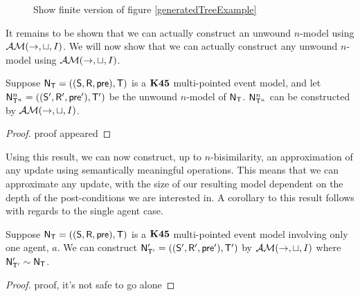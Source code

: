 \begin{figure}
\centering
\caption{\FIXME Show finite version of figure \ref{generatedTreeExample}} \label{genSubtreeExample}
\end{figure}

It remains to be shown that we can actually construct an unwound $n$-model using
$\mathcal{AM}(\to,\sqcup,I)$.
We will now show that we can actually construct any unwound $n$-model using $\mathcal{AM}(\to,
\sqcup, I)$.

\begin{lemma} \label{unwoundNModelGenerated}
  Suppose $\mathrm{\mathsf{N}}_\mathrm{\mathsf{T}} = ((\mathrm{\mathsf{S}},\mathrm{\mathsf{R}},\mathrm{\mathsf{pre}}),\mathrm{\mathsf{T}})$ is a $\bf K45$ multi-pointed
  event model, and let $\mathrm{\mathsf{N}}^n_{\mathrm{\mathsf{T}}^n} = ((\mathrm{\mathsf{S}}', \mathrm{\mathsf{R}}', \mathrm{\mathsf{pre}}'),\mathrm{\mathsf{T}}')$ be the
  unwound $n$-model of $\mathrm{\mathsf{N}}_\mathrm{\mathsf{T}}$.
  $\mathrm{\mathsf{N}}^n_{\mathrm{\mathsf{T}}^n}$ can be constructed by $\mathcal{AM}(\to, \sqcup, I)$.
\end{lemma}
\begin{proof}
	\FIXME proof appeared
\end{proof}

Using this result, we can now construct, up to $n$-bisimilarity, an
approximation of any update using semantically meaningful operations.
This means that we can approximate any update, with the size of our resulting
model dependent on the depth of the post-conditions we are interested in.
A corollary to this result follows with regards to the single agent case.

\begin{corr}
  Suppose $\mathrm{\mathsf{N}}_\mathrm{\mathsf{T}} = ((\mathrm{\mathsf{S}},\mathrm{\mathsf{R}},\mathrm{\mathsf{pre}}),\mathrm{\mathsf{T}})$ is a $\bf K45$ multi-pointed
  event model involving only one agent, $a$.
  We can construct $\mathrm{\mathsf{N}}'_{\mathrm{\mathsf{T}}'} = ((\mathrm{\mathsf{S}}',\mathrm{\mathsf{R}}',\mathrm{\mathsf{pre}}'),\mathrm{\mathsf{T}}')$ by
  $\mathcal{AM}(\to,\sqcup,I)$ where $\mathrm{\mathsf{N}}'_{\mathrm{\mathsf{T}}'} \sim \mathrm{\mathsf{N}}_\mathrm{\mathsf{T}}$.
\end{corr}
\begin{proof}
	\FIXME proof, it's not safe to go alone
\end{proof}
